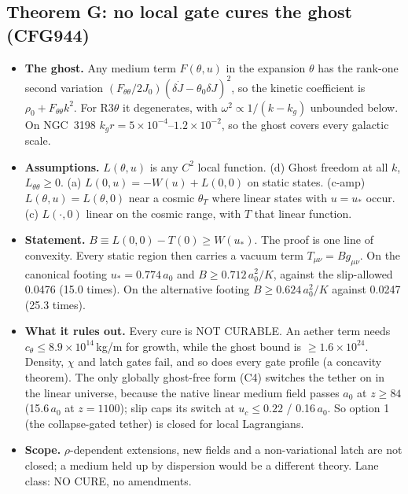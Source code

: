 \documentclass[10pt]{article}
\begin{document}
\subsection{Theorem G: no local gate cures the ghost (CFG944)}
\begin{itemize}
\item \textbf{The ghost.} Any medium term $F(\theta,u)$ in the expansion $\theta$ has the rank-one second variation $(F_{\theta\theta}/2J_0)(\delta\dot J-\theta_0\delta J)^2$, so the kinetic coefficient is $\rho_0+F_{\theta\theta}k^2$. For R3$\theta$ it degenerates, with $\omega^2\propto1/(k-k_g)$ unbounded below. On NGC~3198 $k_gr=5\times10^{-4}$--$1.2\times10^{-2}$, so the ghost covers every galactic scale.
\item \textbf{Assumptions.} $L(\theta,u)$ is any $C^2$ local function. (d) Ghost freedom at all $k$, $L_{\theta\theta}\ge0$. (a) $L(0,u)=-W(u)+L(0,0)$ on static states. (c-amp) $L(\theta,u)=L(\theta,0)$ near a cosmic $\theta_T$ where linear states with $u=u_*$ occur. (c) $L(\cdot,0)$ linear on the cosmic range, with $T$ that linear function.
\item \textbf{Statement.} $B\equiv L(0,0)-T(0)\ge W(u_*)$. The proof is one line of convexity. Every static region then carries a vacuum term $T_{\mu\nu}=Bg_{\mu\nu}$. On the canonical footing $u_*=0.774\,a_0$ and $B\ge0.712\,a_0^2/K$, against the slip-allowed 0.0476 (15.0 times). On the alternative footing $B\ge0.624\,a_0^2/K$ against 0.0247 (25.3 times).
\item \textbf{What it rules out.} Every cure is NOT CURABLE. An aether term needs $c_\theta\le8.9\times10^{14}$\,kg/m for growth, while the ghost bound is $\ge1.6\times10^{24}$. Density, $\chi$ and latch gates fail, and so does every gate profile (a concavity theorem). The only globally ghost-free form (C4) switches the tether on in the linear universe, because the native linear medium field passes $a_0$ at $z\ge84$ (15.6\,$a_0$ at $z=1100$); slip caps its switch at $u_c\le0.22$ / 0.16\,$a_0$. So option 1 (the collapse-gated tether) is closed for local Lagrangians.
\item \textbf{Scope.} $\rho$-dependent extensions, new fields and a non-variational latch are not closed; a medium held up by dispersion would be a different theory. Lane class: NO CURE, no amendments.
\end{itemize}
\end{document}
